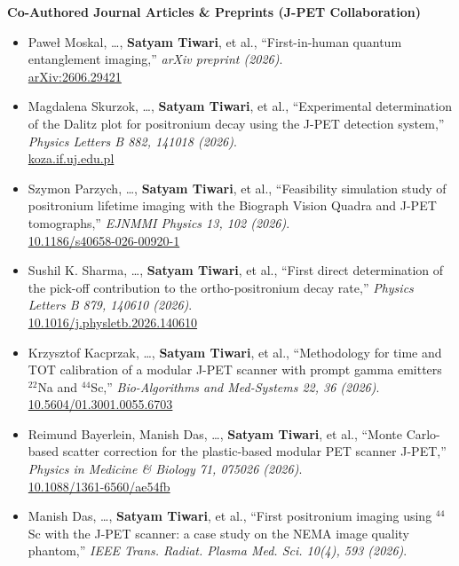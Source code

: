 \textcolor{accentblue}{\textbf{Co-Authored Journal Articles \& Preprints (J-PET Collaboration)}}
\begin{itemize}
\item Pawe{\l} Moskal, \ldots, \textbf{Satyam Tiwari}, et al., ``First-in-human quantum entanglement imaging,'' \emph{arXiv preprint (2026)}.\\
\href{https://arxiv.org/abs/2606.29421}{arXiv:2606.29421}
\item Magdalena Skurzok, \ldots, \textbf{Satyam Tiwari}, et al., ``Experimental determination of the Dalitz plot for positronium decay using the J-PET detection system,'' \emph{Physics Letters B 882, 141018 (2026)}.\\
\href{https://koza.if.uj.edu.pl/staff/stiwari}{koza.if.uj.edu.pl}
\item Szymon Parzych, \ldots, \textbf{Satyam Tiwari}, et al., ``Feasibility simulation study of positronium lifetime imaging with the Biograph Vision Quadra and J-PET tomographs,'' \emph{EJNMMI Physics 13, 102 (2026)}.\\
\href{https://doi.org/10.1186/s40658-026-00920-1}{10.1186/s40658-026-00920-1}
\item Sushil K. Sharma, \ldots, \textbf{Satyam Tiwari}, et al., ``First direct determination of the pick-off contribution to the ortho-positronium decay rate,'' \emph{Physics Letters B 879, 140610 (2026)}.\\
\href{https://doi.org/10.1016/j.physletb.2026.140610}{10.1016/j.physletb.2026.140610}
\item Krzysztof Kacprzak, \ldots, \textbf{Satyam Tiwari}, et al., ``Methodology for time and TOT calibration of a modular J-PET scanner with prompt gamma emitters $^{22}$Na and $^{44}$Sc,'' \emph{Bio-Algorithms and Med-Systems 22, 36 (2026)}.\\
\href{https://doi.org/10.5604/01.3001.0055.6703}{10.5604/01.3001.0055.6703}
\item Reimund Bayerlein, Manish Das, \ldots, \textbf{Satyam Tiwari}, et al., ``Monte Carlo-based scatter correction for the plastic-based modular PET scanner J-PET,'' \emph{Physics in Medicine \& Biology 71, 075026 (2026)}.\\
\href{https://doi.org/10.1088/1361-6560/ae54fb}{10.1088/1361-6560/ae54fb}
\item Manish Das, \ldots, \textbf{Satyam Tiwari}, et al., ``First positronium imaging using $^{44}$Sc with the J-PET scanner: a case study on the NEMA image quality phantom,'' \emph{IEEE Trans. Radiat. Plasma Med. Sci. 10(4), 593 (2026)}.\\

\end{itemize}
